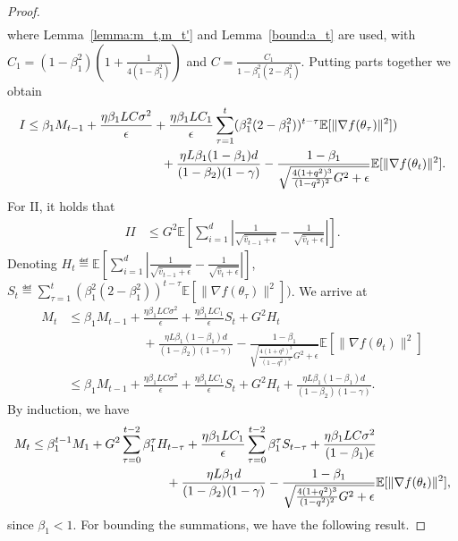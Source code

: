 \documentclass[11pt]{article}
\begin{document}
\begin{proof}
\begin{align*}
\end{align*}
where Lemma~\ref{lemma:m_t,m_t'} and Lemma~\ref{bound:a_t} are used, with $C_1=(1-\beta_1^2)(1+\frac{1}{4(1-\beta_1^2)})$ and $C=\frac{C_1}{1-\beta_1^2(2-\beta_1^2)}$. Putting parts together we obtain
\begin{align*}
    I&\leq \beta_1 M_{t-1}+\frac{\eta \beta_1 LC\sigma^2}{\epsilon}+\frac{\eta \beta_1 LC_1}{\epsilon} \sum_{\tau=1}^t (\beta_1^2(2-\beta_1^2))^{t-\tau}\mathbb E[\|\nabla f(\theta_\tau)\|^2])\\
    &\hspace{1.5in} +\frac{\eta L\beta_1(1-\beta_1)d}{(1-\beta_2)(1-\gamma)}-\frac{1-\beta_1}{\sqrt{\frac{4(1+q^2)^3}{(1-q^2)^2}G^2+\epsilon}}\mathbb E[\|\nabla f(\theta_t)\|^2].
\end{align*}
For II, it holds that
\begin{align*}
    II&\leq G^2 \mathbb E[\sum_{i=1}^d |\frac{1}{\sqrt{\hat v_{t-1}+\epsilon}}-\frac{1}{\sqrt{\hat v_t+\epsilon}}| ].
\end{align*}
Denoting $H_t\eqdef \mathbb E[\sum_{i=1}^d |\frac{1}{\sqrt{\hat v_{t-1}+\epsilon}}-\frac{1}{\sqrt{\hat v_t+\epsilon}}| ]$, $S_t\eqdef \sum_{\tau=1}^t (\beta_1^2(2-\beta_1^2))^{t-\tau}\mathbb E[\|\nabla f(\theta_\tau)\|^2])$. We arrive at
\begin{align*}
    M_t&\leq \beta_1 M_{t-1}+\frac{\eta \beta_1 LC\sigma^2}{\epsilon}+\frac{\eta \beta_1 LC_1}{\epsilon} S_t+G^2 H_t\\
    &\hspace{1in} +\frac{\eta L\beta_1(1-\beta_1)d}{(1-\beta_2)(1-\gamma)}-\frac{1-\beta_1}{\sqrt{\frac{4(1+q^2)^3}{(1-q^2)^2}G^2+\epsilon}}\mathbb E[\|\nabla f(\theta_t)\|^2]\\
    &\leq \beta_1 M_{t-1}+\frac{\eta \beta_1 LC\sigma^2}{\epsilon}+\frac{\eta \beta_1 LC_1}{\epsilon} S_t+G^2 H_t+\frac{\eta L\beta_1(1-\beta_1)d}{(1-\beta_2)(1-\gamma)}.
\end{align*}
By induction, we have
\begin{align*}
    M_t&\leq \beta_1^{t-1} M_1+G^2 \sum_{\tau=0}^{t-2} \beta_1^\tau H_{t-\tau}+\frac{\eta \beta_1 LC_1}{\epsilon} \sum_{\tau=0}^{t-2}\beta_1^\tau S_{t-\tau}+ \frac{\eta \beta_1 LC\sigma^2}{(1-\beta_1)\epsilon}\\
    &\hspace{1.5in} +\frac{\eta L\beta_1 d}{(1-\beta_2)(1-\gamma)}-\frac{1-\beta_1}{\sqrt{\frac{4(1+q^2)^3}{(1-q^2)^2}G^2+\epsilon}}\mathbb E[\|\nabla f(\theta_t)\|^2],
\end{align*}
since $\beta_1<1$. For bounding the summations, we have the following result.



\end{proof}
\end{document}
